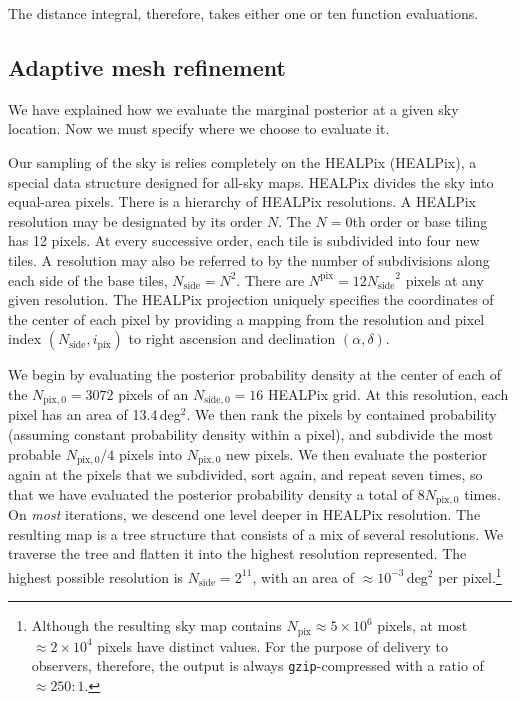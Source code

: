 \documentclass[amsmath,amssymb,aps,prx,reprint,nopreprintnumbers,nofootinbib]{revtex4-1}
\begin{document}
The distance integral, therefore, takes either one or ten function evaluations.

\subsection{Adaptive mesh refinement}

We have explained how we evaluate the marginal posterior at a given sky location. Now we must specify where we choose to evaluate it.

Our sampling of the sky is relies completely on the \acl{HEALPix} (\acs{HEALPix}), a special data structure designed for all\nobreakdashes-sky maps. \ac{HEALPix} divides the sky into equal\nobreakdashes-area pixels. There is a hierarchy of \ac{HEALPix} resolutions. A HEALPix resolution may be designated by its order $N$. The $N=0$th order or base tiling has 12 pixels. At every successive order, each tile is subdivided into four new tiles. A resolution may also be referred to by the number of subdivisions along each side of the base tiles, $N_\mathrm{side} = N^2$. There are $N^\mathrm{pix} = 12 {N_\mathrm{side}}^2$ pixels at any given resolution. The \ac{HEALPix} projection uniquely specifies the coordinates of the center of each pixel by providing a mapping from the resolution and pixel index $(N_\mathrm{side}, i_\mathrm{pix})$ to right ascension and declination $(\alpha, \delta)$.

We begin by evaluating the posterior probability density at the center of each of the $N_{\mathrm{pix},0} = 3072$ pixels of an $N_{\mathrm{side},0}=16$ \ac{HEALPix} grid. At this resolution, each pixel has an area of 13.4\,deg$^2$. We then rank the pixels by contained probability (assuming constant probability density within a pixel), and subdivide the most probable $N_{\mathrm{pix},0}/4$ pixels into $N_{\mathrm{pix},0}$ new pixels. We then evaluate the posterior again at the pixels that we subdivided, sort again, and repeat seven times, so that we have evaluated the posterior probability density a total of $8 N_{\mathrm{pix},0}$ times. On \emph{most} iterations, we descend one level deeper in \ac{HEALPix} resolution. The resulting map is a tree structure that consists of a mix of several resolutions. We traverse the tree and flatten it into the highest resolution represented. The highest possible resolution is $N_\mathrm{side}=2^{11}$, with an area of $\approx 10^{-3}$\,deg$^2$ per pixel.\footnote{Although the resulting sky map contains $N_\mathrm{pix} \approx 5\times10^6$ pixels, at most $\approx 2\times10^4$ pixels have distinct values. For the purpose of delivery to observers, therefore, the output is always \texttt{gzip}\nobreakdashes-compressed with a ratio of $\approx 250:1$.}
\end{document}

